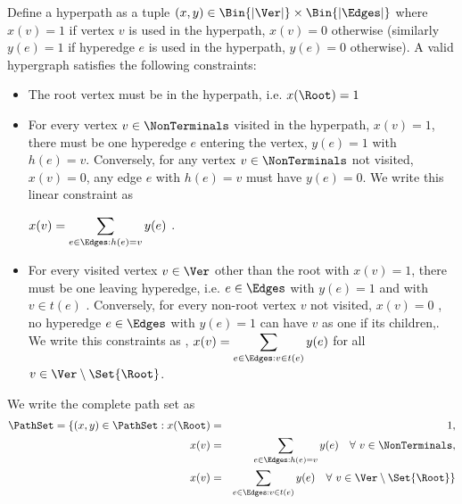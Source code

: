 Define a hyperpath as a tuple $(x, y) \in \Bin{|\Ver|} \times \Bin{| \Edges |}$ 
where $x(v) =1$ if vertex $v$ is used in the
hyperpath, $x(v) = 0$ otherwise (similarly $y(e) = 1$ if hyperedge $e$ is
used in the hyperpath, $y(e)= 0$ otherwise).  A valid hypergraph
satisfies the following constraints:

\begin{itemize}

\item
The root vertex must be in the hyperpath, i.e.  $x(\Root) = 1$

\item For every vertex $v \in \NonTerminals$ visited in the hyperpath,
  $x(v) = 1$, there must be one hyperedge $e$ entering the vertex, $y(e) = 1$ 
  with $h(e) = v$. Conversely, for any vertex $v \in
  \NonTerminals$ not visited, $x(v) = 0$, any edge $e$ with $h(e) = v$
  must have $y(e) = 0$. We write this linear constraint as 

$\displaystyle x(v) = \sum_{e \in \Edges: h(e) = v} y(e)$ .

\item For every visited vertex $v \in \Ver$ other than the root with
  $x(v) = 1$, there must be one leaving hyperedge, i.e. $e \in \Edges$
  with $y(e) = 1$ and with $v \in t(e)$ . Conversely, for every non-root
  vertex $v$ not visited, $x(v) = 0$ , no hyperedge $e\in \Edges$ with
  $y(e) = 1$ can have $v$ as one if its children,.  We write this
  constraints as , $\displaystyle x(v) = \sum_{e \in \Edges: v \in t(e)} y(e)$ for all $v \in \Ver \setminus \Set{\Root}$.
\end{itemize}



We write the complete path  set as
\begin{eqnarray*}
  \PathSet = \{ (x, y) \in \PathSet : x(\Root) &=& 1, \\
  x(v) &=& \sum_{e \in \Edges: h(e) = v} y(e) \ \ \ \forall \ v \in \NonTerminals,  \\
  x(v) &=& \sum_{e \in \Edges : v \in t(e)} y(e)\ \ \ \forall \ v \in \Ver \setminus \Set{\Root} \}
\end{eqnarray*}


